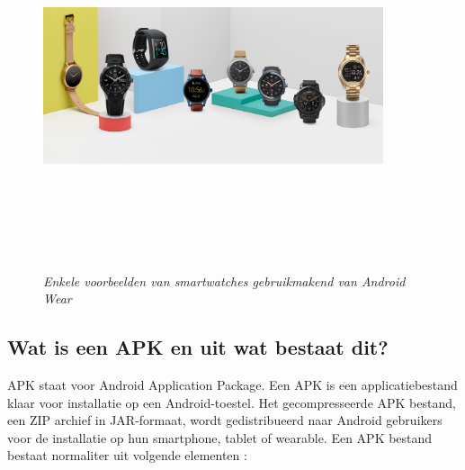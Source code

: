 \begin{figure}[H]
	\centering
	\caption{\textit{Enkele voorbeelden van smartwatches gebruikmakend van Android Wear}}
	\includegraphics[width=10cm, height=10cm, keepaspectratio]{img/WearExamples}\\[.5cm]
\end{figure}
\subsection{Wat is een APK en uit wat bestaat dit?}
APK staat voor Android Application Package. Een APK is een applicatiebestand klaar voor installatie op een Android-toestel. Het gecompresseerde APK bestand, een ZIP archief in JAR-formaat, wordt gedistribueerd naar Android gebruikers voor de installatie op hun smartphone, tablet of wearable. \autocite{PCMag}
Een APK bestand bestaat normaliter uit volgende elementen : 

